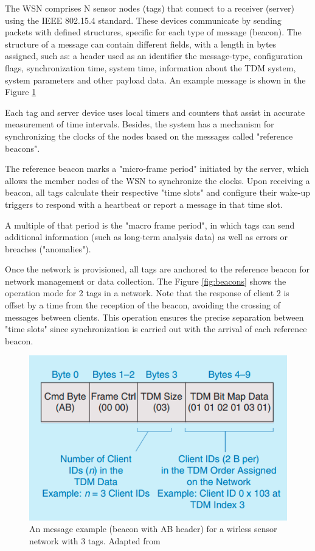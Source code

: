 \documentclass[journal]{IEEEtran}	%
\begin{document}
The WSN comprises N sensor nodes (tags) that connect to a receiver (server) using the IEEE 802.15.4 standard. These devices communicate by sending packets with defined structures, specific for each type of message (beacon). The structure of a message can contain different fields, with a length in bytes assigned, such as: a header used as an identifier the message-type, configuration flags, synchronization time, system time, information about the TDM system, system parameters and other payload data. An example message is shown in the Figure \ref{fig:beacon_example}

Each tag and server device uses local timers and counters that assist in accurate measurement of time intervals. Besides, the system has a mechanism for synchronizing the clocks of the nodes based on the messages called "reference beacons".

The reference beacon marks a "micro-frame period" initiated by the server, which allows the member nodes of the WSN to synchronize the clocks. Upon receiving a beacon, all tags calculate their respective "time slots" and configure their wake-up triggers to respond with a heartbeat or report a message in that time slot.

A multiple of that period is the "macro frame period", in which tags can send additional information (such as long-term analysis data) as well as errors or breaches ("anomalies").

Once the network is provisioned, all tags are anchored to the reference beacon for network management or data collection. The Figure \ref{fig:beacons} shows the operation mode for 2 tags in a network. Note that the response of client 2 is offset by a time from the reception of the beacon, avoiding the crossing of messages between clients. This operation ensures the precise separation between "time slots" since synchronization is carried out with the arrival of each reference beacon.\\

\begin{figure}[H]
\centering
\includegraphics[width=0.9\columnwidth]{fig10.png}
\caption{An message example (beacon with AB header) for a wirless sensor network with 3 tags. Adapted from \cite{williams2017weaving}}
\label{fig:beacon_example}
\end{figure}
\end{document}
